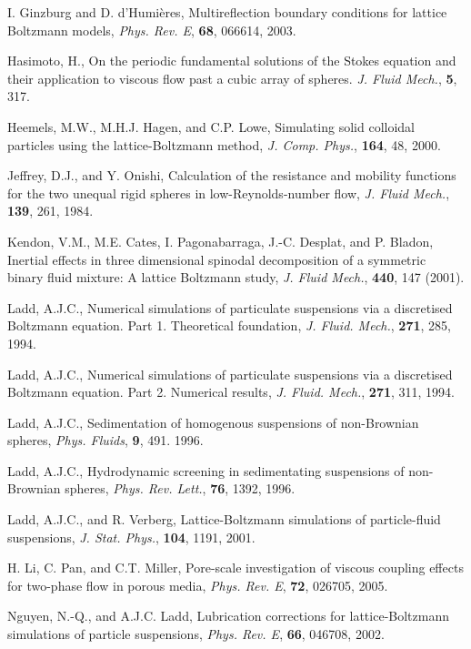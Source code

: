 \begin{thebibliography}{99}
I. Ginzburg and D. d'Humi\`eres,
Multireflection boundary conditions for lattice Boltzmann models,
\textit{Phys. Rev. E}, \textbf{68}, 066614, 2003.

Hasimoto, H., On the periodic fundamental solutions of the Stokes
equation and their application to viscous flow past a cubic array
of spheres.
\textit{J. Fluid Mech.}, \textbf{5}, 317.

Heemels, M.W., M.H.J. Hagen, and C.P. Lowe, Simulating solid colloidal
particles using the lattice-Boltzmann method,
\textit{J. Comp. Phys.}, \textbf{164}, 48, 2000.

Jeffrey, D.J., and Y. Onishi,
Calculation of the resistance and mobility functions for the two
unequal rigid spheres in low-Reynolds-number flow,
\textit{J. Fluid Mech.}, \textbf{139}, 261, 1984.

Kendon, V.M., M.E. Cates, I. Pagonabarraga, J.-C. Desplat, and
P. Bladon,
Inertial effects in three dimensional spinodal decomposition of
a symmetric binary fluid mixture: A lattice Boltzmann study,
\textit{J. Fluid Mech.}, \textbf{440}, 147 (2001).

Ladd, A.J.C., Numerical simulations of particulate suspensions
via a discretised Boltzmann equation. Part 1. Theoretical foundation,
\textit{J. Fluid. Mech.}, \textbf{271}, 285, 1994.

Ladd, A.J.C., Numerical simulations of particulate suspensions
via a discretised Boltzmann equation. Part 2. Numerical results,
\textit{J. Fluid. Mech.}, \textbf{271}, 311, 1994.

Ladd, A.J.C., Sedimentation of homogenous suspensions of non-Brownian
spheres,
\textit{Phys. Fluids}, \textbf{9}, 491. 1996.

Ladd, A.J.C., Hydrodynamic screening in sedimentating suspensions
of non-Brownian spheres,
\textit{Phys. Rev. Lett.}, \textbf{76}, 1392, 1996.

Ladd, A.J.C., and R. Verberg,
Lattice-Boltzmann simulations of particle-fluid suspensions,
\textit{J. Stat. Phys.}, \textbf{104}, 1191, 2001.

H. Li, C. Pan, and C.T. Miller,
Pore-scale investigation of viscous coupling effects for two-phase
flow in porous media,
\textit{Phys. Rev. E}, \textbf{72}, 026705, 2005.

Nguyen, N.-Q., and A.J.C. Ladd, Lubrication corrections for
lattice-Boltzmann simulations of particle suspensions,
\textit{Phys. Rev. E}, \textbf{66}, 046708, 2002.


\end{thebibliography}
